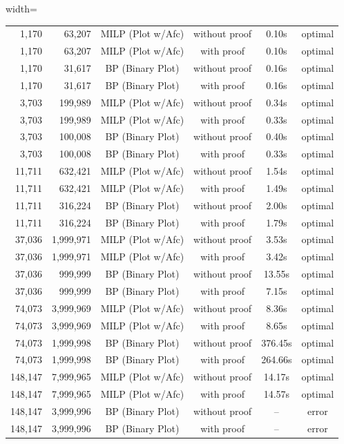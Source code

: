 \documentclass{oqireport}
\begin{document}
\begin{table}[H]
\begin{adjustbox}{width=\textwidth}
\begin{tabular}{rrcccc}
\midrule
1,170 & 63,207 & MILP (Plot w/Afc) & without proof & 0.10s & optimal \\
1,170 & 63,207 & MILP (Plot w/Afc) & with proof & 0.10s & optimal \\
1,170 & 31,617 & BP (Binary Plot) & without proof & 0.16s & optimal \\
1,170 & 31,617 & BP (Binary Plot) & with proof & 0.16s & optimal \\
\midrule
3,703 & 199,989 & MILP (Plot w/Afc) & without proof & 0.34s & optimal \\
3,703 & 199,989 & MILP (Plot w/Afc) & with proof & 0.33s & optimal \\
3,703 & 100,008 & BP (Binary Plot) & without proof & 0.40s & optimal \\
3,703 & 100,008 & BP (Binary Plot) & with proof & 0.33s & optimal \\
\midrule
11,711 & 632,421 & MILP (Plot w/Afc) & without proof & 1.54s & optimal \\
11,711 & 632,421 & MILP (Plot w/Afc) & with proof & 1.49s & optimal \\
11,711 & 316,224 & BP (Binary Plot) & without proof & 2.00s & optimal \\
11,711 & 316,224 & BP (Binary Plot) & with proof & 1.79s & optimal \\
\midrule
37,036 & 1,999,971 & MILP (Plot w/Afc) & without proof & 3.53s & optimal \\
37,036 & 1,999,971 & MILP (Plot w/Afc) & with proof & 3.42s & optimal \\
37,036 & 999,999 & BP (Binary Plot) & without proof & 13.55s & optimal \\
37,036 & 999,999 & BP (Binary Plot) & with proof & 7.15s & optimal \\
\midrule
74,073 & 3,999,969 & MILP (Plot w/Afc) & without proof & 8.36s & optimal \\
74,073 & 3,999,969 & MILP (Plot w/Afc) & with proof & 8.65s & optimal \\
74,073 & 1,999,998 & BP (Binary Plot) & without proof & 376.45s & optimal \\
74,073 & 1,999,998 & BP (Binary Plot) & with proof & 264.66s & optimal \\
\midrule
148,147 & 7,999,965 & MILP (Plot w/Afc) & without proof & 14.17s & optimal \\
148,147 & 7,999,965 & MILP (Plot w/Afc) & with proof & 14.57s & optimal \\
148,147 & 3,999,996 & BP (Binary Plot) & without proof &  --  & error \\
148,147 & 3,999,996 & BP (Binary Plot) & with proof &  --  & error \\
\bottomrule
\end{tabular}
\end{adjustbox}
\end{table}
\end{document}
